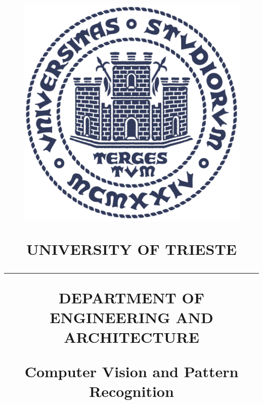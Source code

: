 %
\begin{titlepage}
{
\title{
	\enlargethispage{0.1\textheight}
	\vspace{-1cm}
	\begin{center}
		\begin{minipage}{0.20\textwidth}
			\centering
			\includegraphics[width=0.85\textwidth]{fig/new_logo.png} %
		\end{minipage}
		\begin{minipage}{0.75\textwidth}
			\small
			\begin{flushleft}
				{\sffamily UNIVERSITY OF TRIESTE}
			\end{flushleft}
			\rule{0.95\linewidth}{1.5pt}
			\begin{flushleft}
				{\sffamily DEPARTMENT OF ENGINEERING AND ARCHITECTURE}
			\end{flushleft}		
		\end{minipage}
	\end{center}
	\vspace{1cm}
	\begin{center}
		{\sffamily\Large Computer Vision and Pattern Recognition}
	\end{center}
	\vspace{2.5cm}
}}
\end{titlepage}
